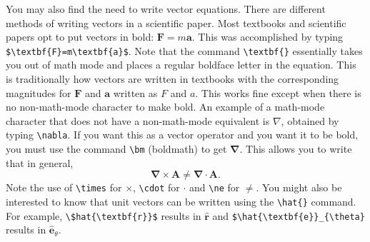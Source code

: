 \documentclass[preprint,pre,floats,aps,amsmath,amssymb]{revtex4}
\begin{document}
You may also find the need to write vector equations.  There are
different methods of writing vectors in a scientific paper.  Most
textbooks and scientific papers opt to put vectors in bold:
$\textbf{F}=m\textbf{a}$.  This was accomplished by typing
\verb!$\textbf{F}=m\textbf{a}$!.  Note that the command
\verb!\textbf{}! essentially takes you out of math mode and places a
regular boldface letter in the equation.  This is traditionally how
vectors are written in textbooks with the corresponding magnitudes for
$\textbf{F}$ and $\textbf{a}$ written as $F$ and $a$.  This works fine
except when there is no non-math-mode character to make bold.  An
example of a math-mode character that does not have a non-math-mode
equivalent is $\nabla$, obtained by typing \verb!\nabla!.  If you want
this as a vector operator and you want it to be bold, you must use the
command \verb!\bm! (boldmath) to get $\bm{\nabla}$.  This allows you
to write that in general,
\begin{equation}
\bm{\nabla}\times\textbf{A}\ne\bm{\nabla}\cdot\textbf{A}.
\end{equation}
Note the use of \verb!\times! for $\times$, \verb!\cdot! for $\cdot$
and \verb!\ne! for $\ne$.  You might also be interested to know that
unit vectors can be written using the \verb!\hat{}! command.  For
example, \verb!\$hat{\textbf{r}}$! results in $\hat{\textbf{r}}$ and
\verb!$\hat{\textbf{e}}_{\theta}! results in
$\hat{\textbf{e}}_{\theta}$.
\end{document}
